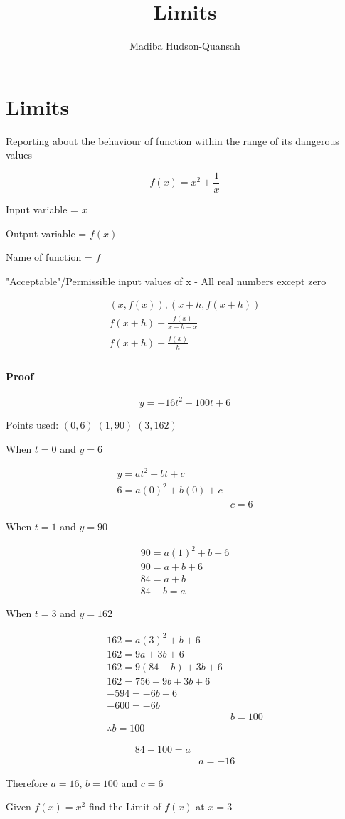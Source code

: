 \documentclass[12pt letter]{article}
\title{Limits}
\author{Madiba Hudson-Quansah}
\begin{document}
\part{Limits}
Reporting about the behaviour of function within the range of its dangerous values

\begin{displaymath}
	f(x) = x^2 + \frac{1}{x}
\end{displaymath}

Input variable = $x$

Output variable = $f(x)$

Name of function = $f$


"Acceptable"/Permissible input values of x - All real numbers except zero

\begin{gather*}
	(x, f(x)), (x+h, f(x+h))      \\
	f(x+h) - \frac{f(x)}{x+h-x} \\
	f(x+h) - \frac{f(x)}{h}         \\
\end{gather*}

\subsection{Proof}

\[y = -16t^2+100t+6\]

Points used:
$(0, 6) \; (1, 90) \; (3,162)$

When $t = 0$ and $y = 6$

\begin{align*}
	y = at^2 + bt+c      \\
	6 = a(0)^2 + b(0) +c \\
	 & c = 6
\end{align*}

When $t=1$ and $y=90$

\begin{align*}
	90 = a(1)^2 +b +6 \\
	90 = a + b + 6    \\
	84 = a + b        \\
	84 - b = a
\end{align*}

When $t=3$ and $y=162$

\begin{align*}
	162 = a(3)^2 + b + 6     \\
	162 = 9a + 3b + 6        \\
	162 = 9(84 - b) + 3b + 6 \\
	162 = 756 - 9b +3b +6    \\
	-594 = -6b +6            \\
	-600 = -6b               \\
	 & b = 100\\[20pt]
	 \therefore b = 100
\end{align*}

\begin{align*}
	84 - 100 = a \\
	 & a = -16
\end{align*}

Therefore $a=16$, $b=100$ and $c=6$
\pagebreak

\large{Given $f(x) = x^2$ find the Limit of $f(x)$ at $x=3$}
\end{document}
